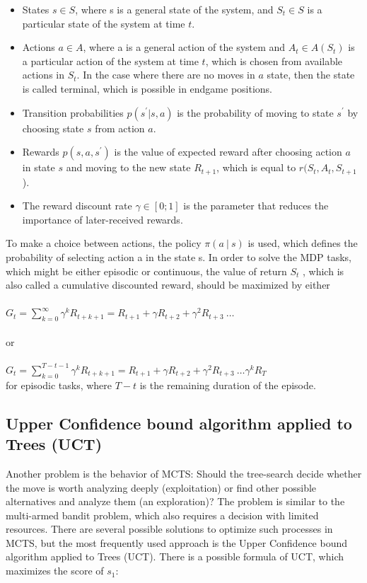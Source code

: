 \documentclass[paper=8.27in:11.69in]{scrartcl}
\begin{document}
\begin{itemize}

\item States $ s \in S $, where s is a general state of the system, and $ S_{t} \in S $  is a particular state of the system at time $ t $.
\item Actions $ a \in A $, where a is a general action of the system and $ A_{t} \in A (S_{t}) $  is a particular action of the system at time $ t $, which is chosen from available actions in   $ S_{t} $. In the case where there are no moves in $ a $ state, then the state is called terminal, which is possible in endgame positions.
\item Transition probabilities $ p (s^{'} | s, a) $ is the probability of moving to state $ s^{'} $ by choosing state $ s $ from action $ a $.
\item Rewards $ p (s, a, s^{'}) $ is the value of expected reward after choosing action $ a $ in state $ s $ and moving to the new state $ R_{t+1} $, which is equal to $r( S_{t}, A_{t}, S_{t+1} $).
\item The reward discount rate $ \gamma  \in [0; 1] $ is the parameter that reduces the importance of later-received rewards.

\end{itemize}

To make a choice between actions, the policy $\pi(a \ | \ s)$ is used, which defines the probability of selecting action a in the state s. In order to solve the MDP tasks, which might be either episodic or continuous, the value of return $ S_{t} $ , which is also called a cumulative discounted reward, should be maximized by either
\\
\\
$ G_{t} = \sum_{k = 0}^{\infty} \gamma^{k}{R}_{t+k+1} = {R}_{t+1} + \gamma{R}_{t+2} + \gamma^{2}{R}_{t+3} \ \ldots $
\\
\\
or
\\
\\
$ G_{t} = \sum_{k = 0}^{T-t-1} \gamma^{k}{R}_{t+k+1} = {R}_{t+1} + \gamma{R}_{t+2} + \gamma^{2}{R}_{t+3} \ \ldots \gamma^{k}{R}_{T} $\\

for episodic tasks, where $ T-t $ is the remaining duration of the episode.
\subsection{Upper Confidence bound algorithm applied to Trees (UCT)}
Another problem is the behavior of MCTS: Should the tree-search decide whether the move is worth analyzing deeply (exploitation) or find other possible alternatives and analyze them (an exploration)? The problem is similar to the multi-armed bandit problem, which also requires a decision with limited resources. There are several possible solutions to optimize such processes in MCTS, but the most frequently used approach is the Upper Confidence bound algorithm applied to Trees (UCT). There is a possible formula of UCT, which maximizes the score of $ {s}_{1} $:
\end{document}
